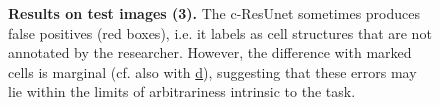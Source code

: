 

\begin{figure}[ht]\ContinuedFloat
\centering
{}
\caption{\textbf{Results on test images (3).} 
The c-ResUnet sometimes produces false positives (red boxes), i.e. it labels as cell structures that are not annotated by the researcher.
However, the difference with marked cells is marginal (cf. also with \hyperref[fig:predictions:false-negatives]{d}), suggesting that these errors may lie within the limits of arbitrariness intrinsic to the task.
} 
\end{figure}


